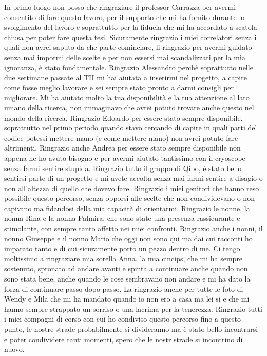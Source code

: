 In primo luogo non posso che ringraziare il professor Carrazza per avermi consentito di fare questo lavoro, per il supporto che mi ha fornito durante lo svolgimento del lavoro e soprattutto per la fiducia che mi ha accordato a scatola chiusa per poter fare questa tesi.
Sicuramente ringrazio i miei correlatori senza i quali non avrei saputo da che parte cominciare, li ringrazio per avermi guidato senza mai impormi delle scelte e per non essersi mai scandalizzati per la mia ignoranza, è stato fondamentale.
Ringrazio Alessandro perchè soprattutto nelle due settimane passate al TII mi hai aiutata a inserirmi nel progetto, a capire come fosse meglio lavorare e sei sempre stato pronto a darmi consigli per migliorare. Mi ha aiutato molto la tua disponibilità e la tua attenzione al lato umano della ricerca, non immaginavo che avrei potuto trovare anche questo nel mondo della ricerca. 
Ringrazio Edoardo per essere stato sempre disponibile, soprattutto nel primo periodo quando stavo cercando di capire in quali parti del codice potessi mettere mano (e come mettere mano) non avrei potuto fare altrimenti.
Ringrazio anche Andrea per essere stato sempre disponibile non appena ne ho avuto bisogno e per avermi aiutato tantissimo con il cryoscope senza farmi sentire stupida.
Ringrazio tutto il gruppo di Qibo, è stato bello sentirsi parte di un progetto e mi avete accolta senza mai farmi sentire a disagio o non all'altezza di quello che dovevo fare.
Ringrazio i miei genitori che hanno reso possibile questo percorso, senza opporsi alle scelte che non condividevano o non capivano ma fidandosi della mia capacità di orientarmi.
Ringrazio le nonne, la nonna Rina e la nonna Palmira, che sono state una presenza rassicurante e stimolante, con sempre tanto affetto nei miei confronti. 
Ringrazio anche i nonni, il nonno Giuseppe e il nonno Mario che oggi non sono qui ma dai cui racconti ho imparato tanto e di cui sicuramente porto un pezzo dentro di me.
Ci tengo moltissimo a ringraziare mia sorella Anna, la mia cincips, che mi ha sempre sostenuto, spronato ad andare avanti e spinta a continuare anche quando non sono stata bene, anche quando le cose sembravano non andare e mi ha dato la forza di continuare passo dopo passo.
La ringrazio anche per tutte le foto di Wendy e Mila che mi ha mandato quando io non ero a casa ma lei sì e che mi hanno sempre strappato un sorriso o una lacrima per la tenerezza.
Ringrazio tutti i miei compagni di corso con cui ho condiviso questo percorso fino a questo punto, le nostre strade probabilmente si divideranno ma è stato bello incontrarsi e poter condividere tanti momenti, spero che le nostr strade si incontrino di nuovo.

